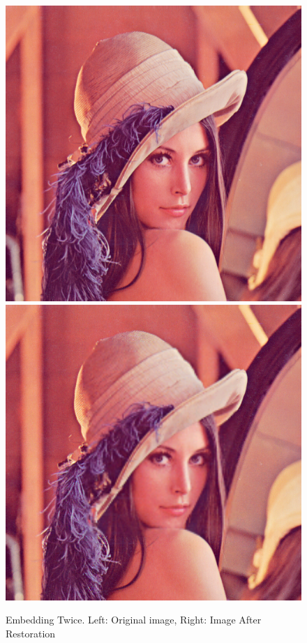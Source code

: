 \documentclass[12pt]{article}
\begin{document}
\begin{figure}[h]
\centerline{%
\includegraphics[scale=0.45]{"lena"}%
\hspace{0.1cm}
\includegraphics[scale=0.45]{"Lena Embed twice 0.7 threshold/finalImageAfterRestoration"}%
}%
\caption{Embedding Twice. Left: Original image, Right: Image After Restoration}
\label{fig:lenaEmbedTwiceRestoration}
\end{figure}
\end{document}
